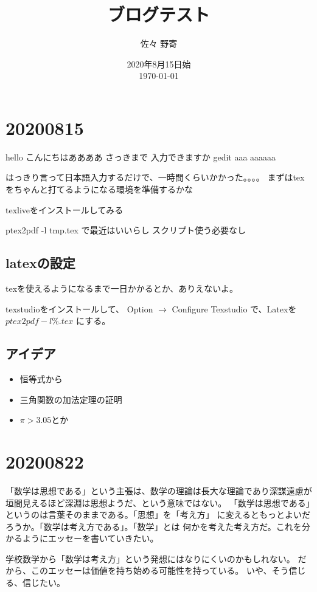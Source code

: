 \documentclass[fleqn]{jsarticle}
\begin{document}
\title{ブログテスト}
\author{佐々 野寄}
\date{2020年8月15日始 \\ \today}
\maketitle

\section{20200815}

hello こんにちはああああ
さっきまで 入力できますか
gedit aaa aaaaaa


はっきり言って日本語入力するだけで、一時間くらいかかった。。。。
まずはtexをちゃんと打てるようになる環境を準備するかな

texliveをインストールしてみる

ptex2pdf -l tmp.tex
で最近はいいらし
スクリプト使う必要なし

\subsection{latexの設定}

texを使えるようになるまで一日かかるとか、ありえないよ。

texstudioをインストールして、
Option $\to$ Configure Texstudio
で、Latexを
$
ptex2pdf -l　\%.tex
$
にする。

\subsection{アイデア}
\begin{itemize}
\item 恒等式から
\item 三角関数の加法定理の証明
\item $\pi > 3.05$とか
\end{itemize}


\section{20200822}

「数学は思想である」という主張は、数学の理論は長大な理論であり深謀遠慮が
垣間見えるほど深淵は思想ようだ、という意味ではない。
「数学は思想である」というのは言葉そのままである。「思想」を「考え方」
に変えるともっとよいだろうか。「数学は考え方である」。「数学」とは
何かを考えた考え方だ。これを分かるようにエッセーを書いていきたい。

学校数学から「数学は考え方」という発想にはなりにくいのかもしれない。
だから、このエッセーは価値を持ち始める可能性を持っている。
いや、そう信じる、信じたい。
\end{document}
